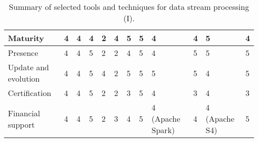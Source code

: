 \begin{sidewaystable}[!ht]
\begin{center}
\begin{tabular}[c]{|p{1.7cm}|p{1.5cm}|p{1.5cm}|p{1.5cm}|p{1.5cm}|p{1.5cm}|p{1.5cm}|p{1.5cm}|p{1.5cm}|p{1.5cm}|p{1.5cm}|p{1.5cm}|}
  Maturity & 4 & 4&  4& 2 & 4 & 5  & 5  & 4 & 4 & 5 &4 \\ \hline  
  Presence & 4 & 4 & 5 & 2 & 2 & 4 & 5 & 4 & 5 & 5 &5 \\ \hline  
  Update and evolution & 4 & 4 & 5  & 4 & 2 & 5 & 5 & 5 & 5 & 4 &5\\ \hline  
  Certification & 4 &4 & 5 & 2 & 2 & 3 & 5 & 4 & 3 & 4 & 3\\ \hline  
  Financial support & 4 & 4&  5 & 2 & 3 & 4 & 5 & 4 (Apache Spark) & 4  & 4 (Apache S4) & 5 \\ \hline  
  
\hline
\end{tabular}
\caption{Summary of selected tools and techniques for data stream processing  (I).}\label{table:tools-1}
  \end{center}
\end{sidewaystable} 

